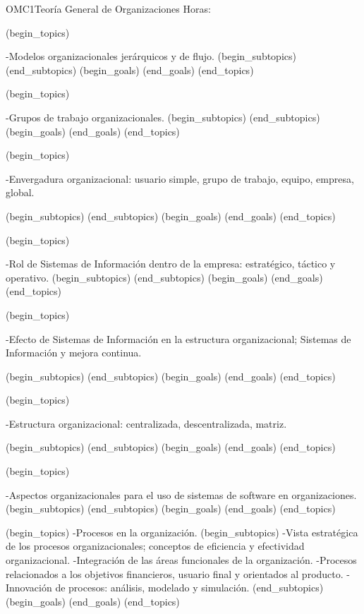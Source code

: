 \begin{BKL2}{OMC1}{Teorí­a General de Organizaciones}
Horas:
 
(begin_topics)

-Modelos organizacionales jerárquicos y de flujo.
(begin_subtopics)
(end_subtopics)
(begin_goals)
(end_goals)
(end_topics)

 

(begin_topics)

-Grupos de trabajo organizacionales.
(begin_subtopics)
(end_subtopics)
(begin_goals)
(end_goals)
(end_topics)

 

(begin_topics)

-Envergadura organizacional: usuario simple, grupo de trabajo, equipo, empresa, global.

(begin_subtopics)
(end_subtopics)
(begin_goals)
(end_goals)
(end_topics)

 

(begin_topics)

-Rol de Sistemas de Información dentro de la empresa: estratégico, táctico y operativo.
(begin_subtopics)
(end_subtopics)
(begin_goals)
(end_goals)
(end_topics)

 

(begin_topics)

-Efecto de Sistemas de Información en la estructura organizacional; Sistemas de Información y mejora continua.

(begin_subtopics)
(end_subtopics)
(begin_goals)
(end_goals)
(end_topics)

 

(begin_topics)

-Estructura organizacional: centralizada, descentralizada, matriz.

(begin_subtopics)
(end_subtopics)
(begin_goals)
(end_goals)
(end_topics)

 

(begin_topics)

-Aspectos organizacionales para el uso de sistemas de software en organizaciones.
(begin_subtopics)
(end_subtopics)
(begin_goals)
(end_goals)
(end_topics)

(begin_topics)
-Procesos en la organización.
(begin_subtopics)
-Vista estratégica de los procesos organizacionales; conceptos de eficiencia y efectividad organizacional.
-Integración de las áreas funcionales de la organización.
-Procesos relacionados a los objetivos financieros, usuario final y orientados al producto.
-Innovación de procesos: análisis, modelado y simulación. 
(end_subtopics)
(begin_goals)
(end_goals)
(end_topics)


\end{BKL2}
